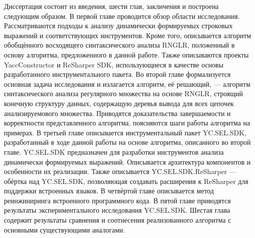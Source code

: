 Диссертация состоит из введения, шести глав, закличения и построена следующим образом. В первой главе проводится обзор области исследования. Рассматриваются подходы к анализу динамически формируемых строковых выражений и соответствующих инструментов. Кроме того, описывается алгоритм обобщённого восходящего синтаксического анализа RNGLR, положенный в основу алгоритма, предложенного в данной работе. Также описываются 
проекты YaccConstructor и ReSharper SDK, использующиеся в качестве основы разработанного инструментального пакета. Во второй главе формализуется основная задача исследования и излагается алгоритм, её решающий, --- алгоритм синтаксического анализа регулярного множества на основе RNGLR, строящий конечную структуру данных, содержащую деревья вывода для всех цепочек анализируемового множества. Приводятся доказательства завершаемости и корректности представленного алгоритма, поясняются шаги работы алгоритма на примерах. В третьей главе описывается инструментальный пакет YC.SEL.SDK, разработанный в ходе данной работы на основе алгоритма, описанного во второй главе. YC.SEL.SDK предназначен для разработки инструментов анализа динамически формируемых выражений. Описывается архитектура компонентов и особенности их реализации. Также описывается YC.SEL.SDK.ReSharper --- обёртка над YC.SEL.SDK, позволяющая создавать расширения к ReSharper для поддержки встроенных языков. В четвёртой главе описывается метод реинжиниринга встроенного программного кода.  В пятой главе приводятся результаты экспериментального исследования YC.SEL.SDK. Шестая глава содержит результаты сравнения и соотнесения реализованного алгоритма с основными существующими аналогами.


\clearpage
